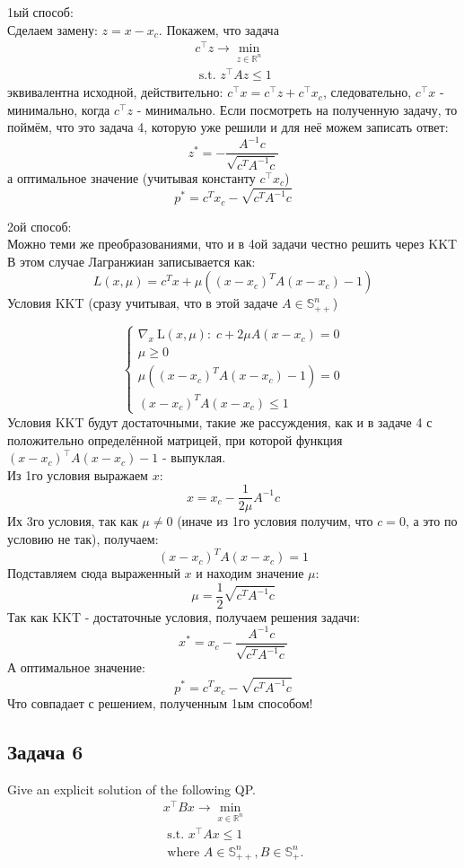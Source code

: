 \documentclass[a4paper,12pt]{article} %
\begin{document}
1ый способ: \\
Сделаем замену: $ z = x - x_c $. Покажем, что задача 
$$
\begin{array}{c}
c^{\top} z \rightarrow \min\limits _{z \in \mathbb{R}^{n}} \\
\text { s.t. }z^{\top} Az \leq 1
\end{array}
$$
эквивалентна исходной, действительно: $ c^{\top} x=c^{\top} z+c^{\top} x_{c}$, следовательно, $ c^{\top} x $ - минимально, когда $ c^{\top} z $ - минимально. Если посмотреть на полученную задачу, то поймём, что это задача 4, которую уже решили и для неё можем записать ответ:
$$
z^* = -\frac{A^{-1} c}{\sqrt{c^{T} A^{-1} c}}
$$ 
а оптимальное значение (учитывая константу $c^{\top} x_{c}$)
$$
p^{*}=c^{T} x_{c}-\sqrt{c^{T} A^{-1} c}
$$

2ой способ:\\
Можно теми же преобразованиями, что и в 4ой задачи честно решить через KKT\\
В этом случае Лагранжиан записывается как:
$$
L(x, \mu)=c^{T} x+\mu\left(\left(x-x_{c}\right)^{T} A\left(x-x_{c}\right)-1\right)
$$
Условия KKT (сразу учитывая, что в этой задаче $ A \in \mathbb{S}_{++}^{n} $)

$$
\left\{\begin{array}{l}
\nabla_{x} \mathrm{~L}(x, \mu): \; c+2 \mu A\left(x-x_{c}\right)=0 \\
\mu \geqslant 0 \\
\mu\left(\left(x-x_{c}\right)^{T} A\left(x-x_{c}\right)-1\right)=0 \\
\left(x-x_{c}\right)^{T} A\left(x-x_{c}\right) \leqslant 1
\end{array}\right.
$$
Условия KKT будут достаточными, такие же рассуждения, как и в задаче 4 с положительно определённой матрицей, при которой функция $\left(x-x_{c}\right)^{\top} A\left(x-x_{c}\right) - 1$ - выпуклая.\\ 
Из 1го условия выражаем $ x $:
$$
x=x_{c}-\frac{1}{2 \mu} A^{-1} c
$$
Их 3го условия, так как $ \mu \neq 0 $ (иначе из 1го условия получим, что $ c = 0 $, а это по условию не так), получаем:
$$
\left(x-x_{c}\right)^{T} A\left(x-x_{c}\right)=1
$$
Подставляем сюда выраженный $ x $ и находим значение $ \mu $:
$$
\mu=\frac{1}{2} \sqrt{c^{T} A^{-1} c}
$$
Так как KKT - достаточные условия, получаем решения задачи: 
$$
x^{*}=x_{c}-\frac{A^{-1} c}{\sqrt{c^{T} A^{-1} c}}
$$
А оптимальное значение:
$$
p^{*}=c^{T} x_{c}-\sqrt{c^{T} A^{-1} c}
$$
Что совпадает с решением, полученным 1ым способом!


\subsection*{Задача 6}
Give an explicit solution of the following QP.
$$
\begin{array}{r}
x^{\top} B x \rightarrow \min\limits _{x \in \mathbb{R}^{n}} \\
\text { s.t. } x^{\top} A x \leq 1 \\
\text { where } A \in \mathbb{S}_{++}^{n}, B \in \mathbb{S}_{+}^{n} .
\end{array}
$$
\end{document}

